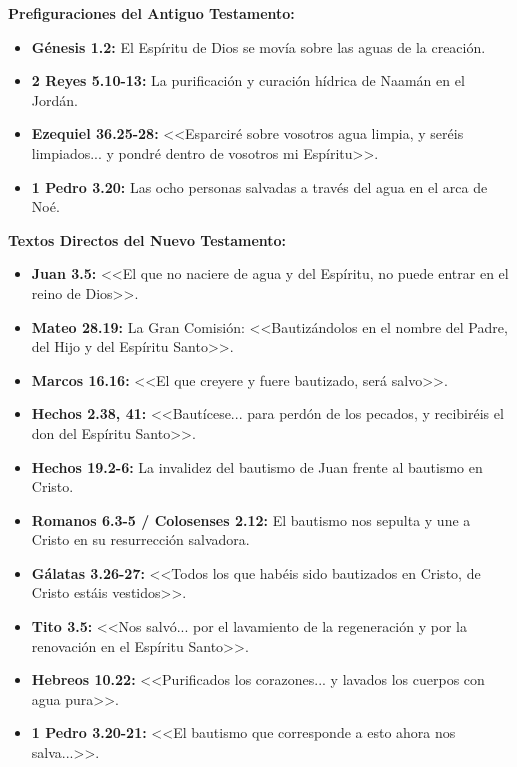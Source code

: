 \documentclass[12pt]{report}
\begin{document}
	\begin{subbloque}
		\textbf{Prefiguraciones del Antiguo Testamento:}
		\begin{itemize}
			\item \textbf{Génesis 1.2:} El Espíritu de Dios se movía sobre las aguas de la creación.
			\item \textbf{2 Reyes 5.10-13:} La purificación y curación hídrica de Naamán en el Jordán.
			\item \textbf{Ezequiel 36.25-28:} <<Esparciré sobre vosotros agua limpia, y seréis limpiados... y pondré dentro de vosotros mi Espíritu>>.
			\item \textbf{1 Pedro 3.20:} Las ocho personas salvadas a través del agua en el arca de Noé.
		\end{itemize}
		
		\textbf{Textos Directos del Nuevo Testamento:}
		\begin{itemize}
			\item \textbf{Juan 3.5:} <<El que no naciere de agua y del Espíritu, no puede entrar en el reino de Dios>>.
			\item \textbf{Mateo 28.19:} La Gran Comisión: <<Bautizándolos en el nombre del Padre, del Hijo y del Espíritu Santo>>.
			\item \textbf{Marcos 16.16:} <<El que creyere y fuere bautizado, será salvo>>.
			\item \textbf{Hechos 2.38, 41:} <<Bautícese... para perdón de los pecados, y recibiréis el don del Espíritu Santo>>.
			\item \textbf{Hechos 19.2-6:} La invalidez del bautismo de Juan frente al bautismo en Cristo.
			\item \textbf{Romanos 6.3-5 / Colosenses 2.12:} El bautismo nos sepulta y une a Cristo en su resurrección salvadora.
			\item \textbf{Gálatas 3.26-27:} <<Todos los que habéis sido bautizados en Cristo, de Cristo estáis vestidos>>.
			\item \textbf{Tito 3.5:} <<Nos salvó... por el lavamiento de la regeneración y por la renovación en el Espíritu Santo>>.
			\item \textbf{Hebreos 10.22:} <<Purificados los corazones... y lavados los cuerpos con agua pura>>.
			\item \textbf{1 Pedro 3.20-21:} <<El bautismo que corresponde a esto ahora nos salva...>>.
		\end{itemize}
	\end{subbloque}
	
\end{document}

